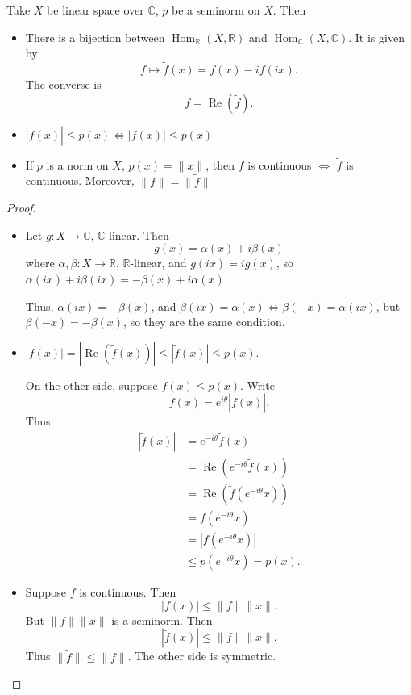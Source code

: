 \begin{lemma}
	\label{lem:RealComplexHom}
	Take $X$ be linear space over $\mathbb{C}$, $p$ be a seminorm on $X$. Then
	\begin{itemize}
		\item There is a bijection between $\operatorname{Hom} _{\mathbb{R}}(X, \mathbb{R})$ and $\operatorname{Hom} _{\mathbb{C}}(X, \mathbb{C})$. It is given by
			\[
				f \mapsto \tilde f(x) = f(x) - i f(i x)
			.\] 
			The converse is
			\[
				f = \operatorname{Re} (\tilde f)
			.\] 
		\item $\left| \tilde f (x) \right| \le p(x) \iff  \left| f(x) \right| \le p(x)$
		\item If $p$ is a norm on $X$, $p(x) = \|x\|$, then $f$ is continuous $\iff $ $\tilde f$ is continuous. Moreover, $\|f\| = \|\tilde f\|$
	\end{itemize}
\end{lemma}
\begin{proof}
	\begin{itemize}
		\item Let $g: X \to \mathbb{C}$, $\mathbb{C}$-linear. Then
			\[
				g(x) = \alpha(x) + i \beta(x)
			\] 
		where $\alpha, \beta: X \to  \mathbb{R}$, $\mathbb{R}$-linear, and $g(i x) = i g(x)$, so $\alpha(i x) + i \beta(i x) = - \beta(x) + i \alpha(x)$.

		Thus, $\alpha (i x) = - \beta(x)$, and $\beta(i x) = \alpha(x) \iff  \beta(- x) = \alpha(i x)$, but $\beta(- x) = - \beta(x)$, so they are the same condition. 

	\item $|f(x)| = \left| \operatorname{Re} (\tilde f(x)) \right|  \le  \left| \tilde f(x) \right| \le p(x)$.

		On the other side, suppose $f(x) \le  p(x)$. Write 
		 \[
			\tilde f(x) = e^{ i \theta} \left| \tilde f(x) \right| 
		.\] 
		Thus
		\begin{align*}
			\left| \tilde f(x) \right| &= e^{ - i \theta} \tilde f(x)\\
			&= \operatorname{Re} \left( e^{- i \theta} \tilde f(x) \right) \\
			&= \operatorname{Re} \left( \tilde f(e^{- i \theta} x) \right) \\
			&= f\left( e^{- i \theta }x \right)  \\
			&= |f\left( e^{- i \theta }x \right)|  \\
			&\leq p\left( e^{- i \theta} x \right) = p(x) 
		.\end{align*}
	\item Suppose $f$ is continuous. Then
		\[
			\left| f(x) \right|  \le  \|f\| \|x\|
		.\] 
		But $\|f\| \|x\|$ is a seminorm. Then
		\[
			\left| \tilde f (x) \right| \le \|f\| \|x\|
		.\] 
		Thus $\|\tilde f\| \le \|f\|$. The other side is symmetric. 
	\end{itemize}
\end{proof}


